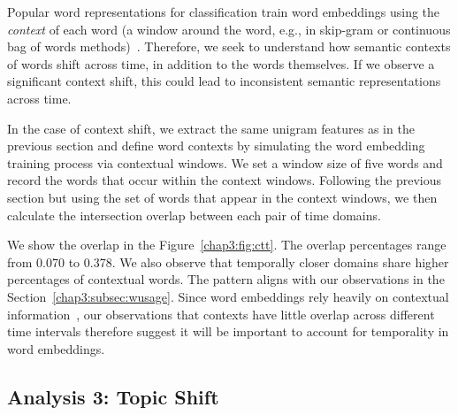 Popular word representations for classification train word embeddings using the \textit{context} of each word (a window around the word, e.g., in skip-gram or continuous bag of words methods)~\cite{mikolov2013distributed, bojanowski2017enriching}.
Therefore, we seek to understand how semantic contexts of words shift across time, in addition to the words themselves. 
If we observe a significant context shift, this could lead to inconsistent semantic representations across time.

In the case of context shift, we extract the same unigram features as in the previous section and define word contexts by simulating the word embedding training process via contextual windows. We set a window size of five words and record the words that occur within the context windows. Following the previous section but using the set of words that appear in the context windows, we then calculate the intersection overlap between each pair of time domains.  

We show the overlap in the Figure~\ref{chap3:fig:ctt}.
The overlap percentages range from 0.070 to 0.378. We also observe that temporally closer domains share higher percentages of contextual words. The pattern aligns with our observations in the Section~\ref{chap3:subsec:wusage}. 
Since word embeddings rely heavily on contextual information~\cite{mikolov2013distributed}, our observations that contexts have little overlap across different time intervals therefore suggest it will be important to account for temporality in word embeddings.


\subsection{Analysis 3: Topic Shift}
\label{chap3:subsec:topic}

